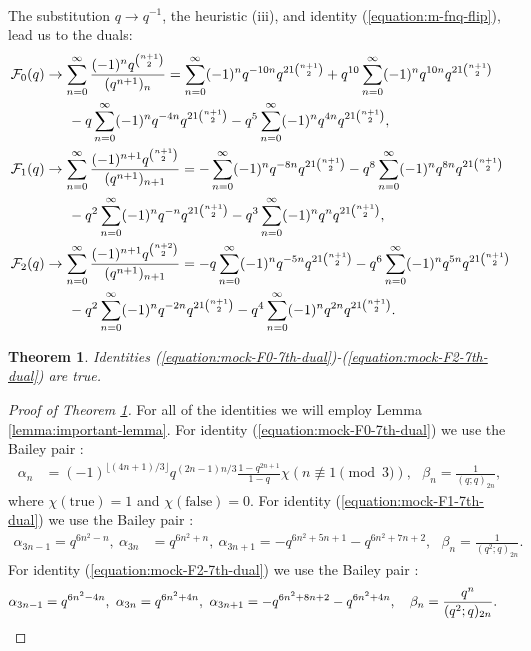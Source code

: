 \documentclass[12pt,reqno]{amsart}
\newtheorem{theorem}{Theorem}
\theoremstyle{remark}
\theoremstyle{definition}
\numberwithin{theorem}{section} \numberwithin{equation}{section}
\numberwithin{example}{section}
\begin{document}
{\begin{align}
\end{align}
The substitution $q\rightarrow q^{-1}$,  the heuristic (iii), and identity (\ref{equation:m-fnq-flip}), lead us to the duals:
{\allowdisplaybreaks \begin{align}
{\mathcal{F}}_0(q)&\rightarrow \sum_{n= 0}^{\infty}\frac{(-1)^nq^{\binom{n+1}{2}}}{(q^{n+1})_{n}}=\sum_{n=0}^{\infty}(-1)^nq^{-10n}q^{21\binom{n+1}{2}}+q^{10}\sum_{n=0}^{\infty}(-1)^nq^{10n}q^{21\binom{n+1}{2}}\notag\\
&\ \ \ \ \ -q\sum_{n=0}^{\infty}(-1)^nq^{-4n}q^{21\binom{n+1}{2}}-q^5\sum_{n=0}^{\infty}(-1)^nq^{4n}q^{21\binom{n+1}{2}},\label{equation:mock-F0-7th-dual}\\
{\mathcal{F}}_1(q)&\rightarrow \sum_{n= 0}^{\infty}\frac{(-1)^{n+1}q^{\binom{n+1}{2}}}{(q^{n+1})_{n+1}}=-\sum_{n=0}^{\infty}(-1)^nq^{-8n}q^{21\binom{n+1}{2}}-q^{8}\sum_{n=0}^{\infty}(-1)^nq^{8n}q^{21\binom{n+1}{2}}\notag\\
&\ \ \ \ \ -q^2\sum_{n=0}^{\infty}(-1)^nq^{-n}q^{21\binom{n+1}{2}}-q^3\sum_{n=0}^{\infty}(-1)^nq^{n}q^{21\binom{n+1}{2}},\label{equation:mock-F1-7th-dual}\\
{\mathcal{F}}_2(q)&\rightarrow \sum_{n= 0}^{\infty}\frac{(-1)^{n+1}q^{\binom{n+2}{2}}}{(q^{n+1})_{n+1}}=-q\sum_{n=0}^{\infty}(-1)^nq^{-5n}q^{21\binom{n+1}{2}}-q^{6}\sum_{n=0}^{\infty}(-1)^nq^{5n}q^{21\binom{n+1}{2}}\notag\\
&\ \ \ \ \ -q^2\sum_{n=0}^{\infty}(-1)^nq^{-2n}q^{21\binom{n+1}{2}}-q^4\sum_{n=0}^{\infty}(-1)^nq^{2n}q^{21\binom{n+1}{2}}.\label{equation:mock-F2-7th-dual}
\end{align}}

\begin{theorem}\label{theorem:seventh-duals}  Identities (\ref{equation:mock-F0-7th-dual})-(\ref{equation:mock-F2-7th-dual}) are true.
\end{theorem}
\begin{proof}[Proof of Theorem \ref{theorem:seventh-duals}]  For all of the identities we will employ Lemma \ref{lemma:important-lemma}.  For identity (\ref{equation:mock-F0-7th-dual}) we use the Bailey pair \cite[$(4.6)$]{Wa1}:
\begin{align*}
\alpha_n&=(-1)^{\lfloor (4n+1)/3 \rfloor}q^{(2n-1)n/3}\frac{1-q^{2n+1}}{1-q}\chi(n\not\equiv 1 \pmod 3),\ \ \ 
\beta_n=\frac{1}{(q;q)_{2n}},
\end{align*}
where $\chi(\text{true})=1$ and $\chi(\text{false})=0$.  For identity (\ref{equation:mock-F1-7th-dual}) we use the Bailey pair \cite[A2]{S}:
\begin{align*}
\alpha_{3n-1}=q^{6n^2-n}, \ \alpha_{3n}&=q^{6n^2+n}, \ \alpha_{3n+1}=-q^{6n^2+5n+1}-q^{6n^2+7n+2},\ \ \ 
\beta_n=\frac{1}{(q^2;q)_{2n}}.
\end{align*}
 For identity (\ref{equation:mock-F2-7th-dual}) we use the Bailey pair   \cite[A4]{S}:
\begin{align*}
\alpha_{3n-1}=q^{6n^2-4n}, \ \alpha_{3n}&=q^{6n^2+4n}, \ \alpha_{3n+1}=-q^{6n^2+8n+2}-q^{6n^2+4n},\ \ \ 
\beta_n=\frac{q^{n}}{(q^2;q)_{2n}}.\qedhere
\end{align*}
\end{proof}

}
\end{document}
